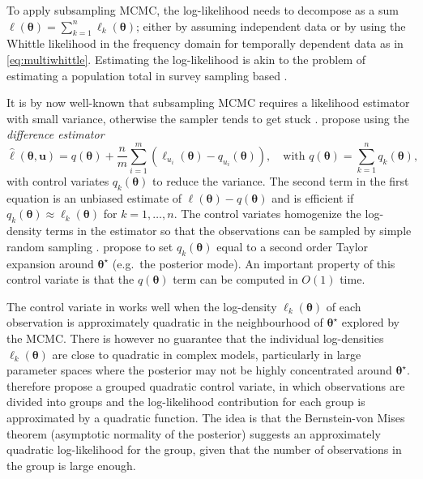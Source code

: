 \documentclass[11pt,english,oneside]{amsart}
\numberwithin{equation}{section}
\theoremstyle{plain}
\numberwithin{equation}{section}
\renewcommand{\v}[1]{\boldsymbol{#1}}
\begin{document}
To apply subsampling MCMC, the log-likelihood needs to decompose as a sum $\ell(\v \theta) = \sum_{k=1}^n \ell_k(\v\theta)$; either by assuming independent data or by using the Whittle likelihood in the frequency domain for temporally dependent data as in \eqref{eq:multiwhittle}. Estimating the log-likelihood is akin to the problem of estimating a population total in survey sampling based \citep{quiroz2018sankhya}. 

It is by now well-known that subsampling MCMC requires a likelihood estimator with small variance, otherwise the sampler tends to get stuck \citep{quiroz2019speeding,quiroz2018sankhya}. \cite{quiroz2019speeding} propose using the \textit{difference estimator} 
\begin{equation*}
 \widehat \ell(\v\theta,\v u) = q(\v \theta) + \frac{n}{m}\sum_{i=1}^m \left( \ell_{u_i}(\v \theta) - q_{u_i}(\v \theta)\right), \quad \text{with } q(\v \theta) = \sum_{k=1}^n q_k(\v\theta),
\end{equation*}
with control variates $q_k(\v\theta)$ to reduce the variance. The second term in the first equation is an unbiased estimate of $\ell(\v \theta)-q(\v \theta)$ and is efficient if $q_k(\v \theta) \approx \ell_k(\v \theta)$ for $k=1, \dots, n$. The control variates homogenize the log-density terms in the estimator so that the observations can be sampled by simple random sampling \citep{quiroz2019speeding}. \cite{bardenet2017markov} propose to set $q_k(\v \theta)$ equal to a second order Taylor expansion around $\v \theta^\star$ (e.g.\ the posterior mode). An important property of this control variate is that the $q(\v \theta)$ term can be computed in $O(1)$ time. 

The control variate in \cite{bardenet2017markov} works well when the log-density $\ell_{k}(\v \theta)$ of each observation is approximately quadratic in the neighbourhood of $\v \theta^\star$ explored by the MCMC. There is however no guarantee that the individual log-densities $\ell_{k}(\v \theta)$ are close to quadratic in complex models, particularly in large parameter spaces where the posterior may not be highly concentrated around $\v \theta^\star$. \cite{salomone2019spectral} therefore propose a grouped quadratic control variate, in which observations are divided into groups and the log-likelihood contribution for each group is approximated by a quadratic function. The idea is that the Bernstein-von Mises theorem (asymptotic normality of the posterior) suggests an approximately quadratic log-likelihood for the
group, given that the number of observations in the group is large enough.
\end{document}
